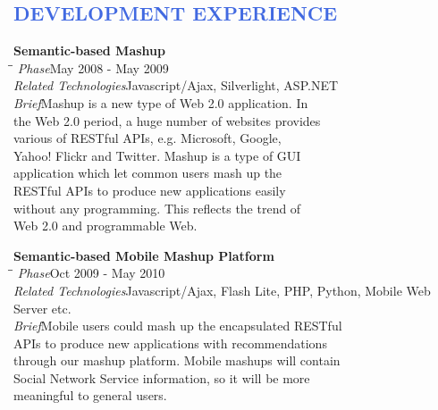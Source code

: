 \documentclass{res}
\begin{document}
\begin{resume}
\textcolor{RoyalBlue}{
\section{DEVELOPMENT EXPERIENCE}
}
\vspace{-0.1in}
\begin{tabbing}
  {\bf Semantic-based Mashup}\\
  \hspace{2.3in}\= \hspace{2.6in}\= \kill
         {\it Phase}\>May 2008 - May 2009\\
         {\it Related Technologies}\>Javascript/Ajax, Silverlight, ASP.NET\\
         {\it Brief}\>Mashup is a new type of Web 2.0 application. In\\
         \>the Web 2.0 period, a huge number of websites provides\\
         \>various of RESTful APIs, e.g. Microsoft, Google,\\
         \>Yahoo! Flickr and Twitter. Mashup is a type of GUI\\
         \>application which let common users mash up the\\
         \>RESTful APIs to produce new applications easily\\
         \>without any programming. This reflects the trend of\\
         \>Web 2.0 and programmable Web.\\
         \end{tabbing}
\vspace{-20pt}

\vspace{-0.1in}
\begin{tabbing}
  {\bf Semantic-based Mobile Mashup Platform}\\
  \hspace{2.3in}\= \hspace{2.6in}\= \kill
         {\it Phase}\>Oct 2009 - May 2010\\
         {\it Related Technologies}\>Javascript/Ajax, Flash Lite, PHP, Python, Mobile Web Server etc.\\
         {\it Brief}\>Mobile users could mash up the encapsulated RESTful\\
         \>APIs to produce new applications with recommendations\\
         \>through our mashup platform. Mobile mashups will contain\\
         \>Social Network Service information, so it will be more\\
         \>meaningful to general users.\\
         \end{tabbing}
\vspace{-20pt}


\end{resume}
\end{document}
